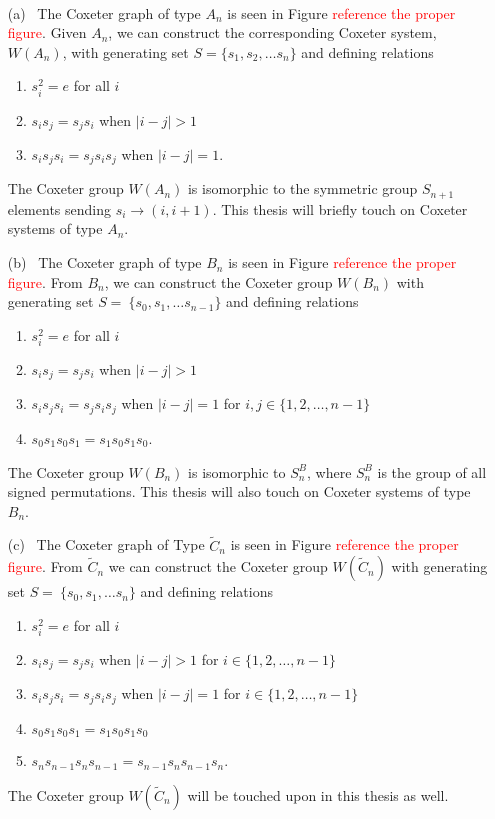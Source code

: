 \begin{example}
~
\begin{itemize}
\item[(a)~] The Coxeter graph of type $A_n$ is seen in Figure \textcolor{red}{reference the proper figure}. Given $A_n$, we can construct the corresponding Coxeter system, $W(A_n)$, with generating set $S=\{s_1, s_2, \ldots s_n\}$ and defining relations
\begin{enumerate}
	\item $s_i^2=e$ for all $i$
	\item $s_is_j=s_js_i$ when $|i-j|>1$
	\item $s_is_js_i=s_js_is_j$ when $|i-j|=1.$
\end{enumerate}
The Coxeter group $W(A_n)$ is isomorphic to the symmetric group $S_{n+1}$ elements sending $s_i \rightarrow (i, i+1)$. This thesis will briefly touch on Coxeter systems of type $A_n$.
\item[(b)~] The Coxeter graph of type $B_n$ is seen in Figure \textcolor{red}{reference the proper figure}. From $B_n$, we can construct the Coxeter group $W(B_n)$ with generating set $S=~\{s_0,s_1, \ldots s_{n-1}\}$ and defining relations
\begin{enumerate}
	\item $s_i^2=e$ for all $i$
	\item $s_is_j=s_js_i$  when $|i-j|>1$
	\item $s_is_js_i=s_js_is_j$ when $|i-j|=1$ for $i,j \in \{1,2,\ldots, n-1\}$
	\item $s_0s_1s_0s_1=s_1s_0s_1s_0$.
\end{enumerate}
The Coxeter group $W(B_n)$ is isomorphic to $S_n^B$, where $S_n^B$ is the group of all signed permutations. This thesis will also touch on Coxeter systems of type $B_n$.
\item[(c)~] The Coxeter graph of Type $\widetilde C_n$ is seen in Figure \textcolor{red}{reference the proper figure}. From $\widetilde C_n$ we can construct the Coxeter group $W(\widetilde C_n)$ with generating set $S=~\{s_0, s_1, \ldots s_n\}$ and defining relations 
\begin{enumerate}
	\item $s_i^2=e$ for all $i$
	\item $s_is_j=s_js_i$ when $|i-j|>1$ for $i \in \{1,2, \ldots, n-1\}$
	\item $s_is_js_i=s_js_is_j$ 	when $|i-j|=1$ for $i \in \{1,2, \ldots, n-1\}$
	\item $s_0s_1s_0s_1=s_1s_0s_1s_0$
	\item $s_ns_{n-1}s_ns_{n-1}=s_{n-1}s_ns_{n-1}s_n.$
\end{enumerate}
The Coxeter group $W(\widetilde C_n)$ will be touched upon in this thesis as well.
\end{itemize}
\end{example}

